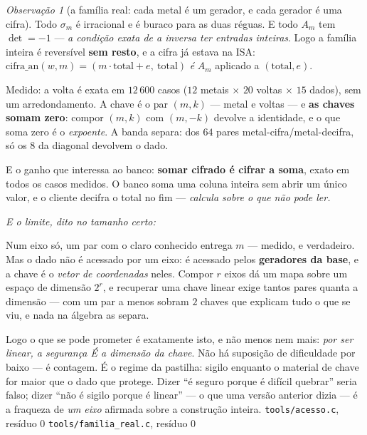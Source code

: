 \documentclass[11pt]{article}
\newcommand{\code}[1]{\texttt{\small #1}}
\theoremstyle{plain}
\theoremstyle{remark}
\newtheorem{obs}{Observação}
\begin{document}
\begin{obs}[a família real: cada metal é um gerador, e cada gerador é uma cifra]\label{obs:familia}
Todo $\sigma_m$ é irracional e é buraco para as duas réguas. E todo $A_m$ tem $\det=-1$ ---
\emph{a condição exata de a inversa ter entradas inteiras}. Logo a família inteira é reversível
\textbf{sem resto}, e a cifra já estava na ISA: $\mathrm{cifra\_an}(w,m)=(m\!\cdot\!\mathrm{total}+e,\
\mathrm{total})$ \emph{é} $A_m$ aplicado a $(\mathrm{total},e)$.

Medido: a volta é exata em $12\,600$ casos ($12$ metais $\times$ $20$ voltas $\times$ $15$ dados),
sem um arredondamento. A chave é o par $(m,k)$ --- metal e voltas --- e \textbf{as chaves somam
zero}: compor $(m,k)$ com $(m,-k)$ devolve a identidade, e o que soma zero é o \emph{expoente}. A
banda separa: dos $64$ pares metal-cifra/metal-decifra, só os $8$ da diagonal devolvem o dado.

E o ganho que interessa ao banco: \textbf{somar cifrado é cifrar a soma}, exato em todos os casos
medidos. O banco soma uma coluna inteira sem abrir um único valor, e o cliente decifra o total no
fim --- \emph{calcula sobre o que não pode ler.}

\begin{center}\emph{E o limite, dito no tamanho certo:}\end{center}
Num eixo só, um par com o claro conhecido entrega $m$ --- medido, e verdadeiro. Mas o dado não é
acessado por um eixo: é acessado pelos \textbf{geradores da base}, e a chave é o \emph{vetor de
coordenadas} neles. Compor $r$ eixos dá um mapa sobre um espaço de dimensão $2^r$, e recuperar uma
chave linear exige tantos pares quanta a dimensão --- com um par a menos sobram $2$ chaves que
explicam tudo o que se viu, e nada na álgebra as separa.

Logo o que se pode prometer é exatamente isto, e não menos nem mais: \emph{por ser linear, a
segurança É a dimensão da chave}. Não há suposição de dificuldade por baixo --- é contagem. É o
regime da pastilha: sigilo enquanto o material de chave for maior que o dado que protege. Dizer
``é seguro porque é difícil quebrar'' seria falso; dizer ``não é sigilo porque é linear'' --- o que
uma versão anterior dizia --- é a fraqueza de \emph{um eixo} afirmada sobre a construção inteira.
\hfill{\small\code{tools/acesso.c}, resíduo $0$} \hfill{\small\code{tools/familia\_real.c}, resíduo $0$}
\end{obs}
\end{document}
